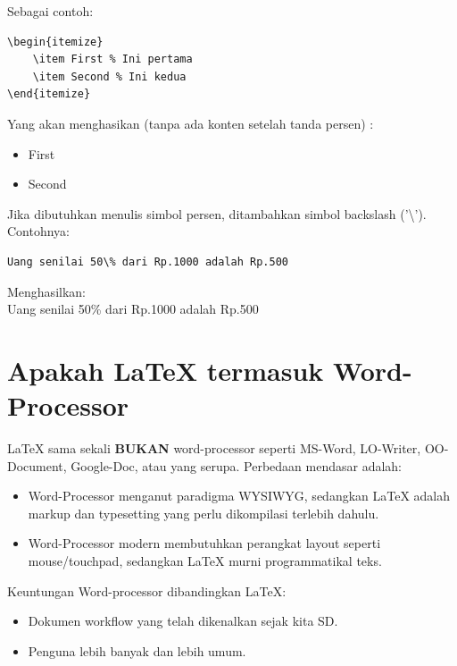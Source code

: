\documentclass{book} %
\begin{document}
    Sebagai contoh:

    \begin{verbatim}
\begin{itemize}
    \item First % Ini pertama
    \item Second % Ini kedua
\end{itemize}
    \end{verbatim}

    Yang akan menghasikan (tanpa ada konten setelah tanda persen) :

    \begin{itemize}
        \item First %
        \item Second %
    \end{itemize}

    Jika dibutuhkan menulis simbol persen, ditambahkan simbol backslash ('\textbackslash').
    Contohnya:

    \begin{verbatim}
Uang senilai 50\% dari Rp.1000 adalah Rp.500
    \end{verbatim}

    Menghasilkan: \\
    Uang senilai 50\% dari Rp.1000 adalah Rp.500

    \section{Apakah LaTeX termasuk Word-Processor}

    LaTeX sama sekali \textbf{BUKAN} word-processor seperti MS-Word, LO-Writer, OO-Document, Google-Doc, atau yang serupa.
    Perbedaan mendasar adalah:
    \begin{itemize}
        \item Word-Processor menganut paradigma WYSIWYG,
        sedangkan LaTeX adalah markup dan typesetting yang perlu dikompilasi terlebih dahulu.

        \item Word-Processor modern membutuhkan perangkat layout seperti mouse/touchpad,
        sedangkan LaTeX murni programmatikal teks.
    \end{itemize}

    \bigskip

    Keuntungan Word-processor dibandingkan LaTeX:
    \begin{itemize}
        \item Dokumen workflow yang telah dikenalkan sejak kita SD.
        \item Penguna lebih banyak dan lebih umum.
    \end{itemize}
\end{document}
